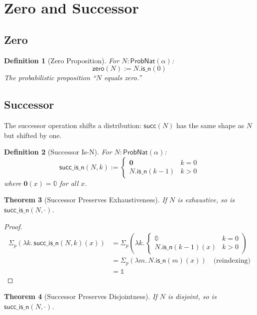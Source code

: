 \documentclass[11pt,a4paper]{article}
\newtheorem{theorem}{Theorem}[section]
\newtheorem{definition}[theorem]{Definition}
\newcommand{\ProbNat}{\mathsf{ProbNat}}
\newcommand{\pzero}{\mathbb{0}}
\newcommand{\pone}{\mathbb{1}}
\newcommand{\psum}{\Sigma_p}
\begin{document}
\section{Zero and Successor}

\subsection{Zero}

\begin{definition}[Zero Proposition]
For $N : \ProbNat(\alpha)$:
\[
\mathsf{zero}(N) := N.\mathsf{is\_n}(0)
\]
The probabilistic proposition ``$N$ equals zero.''
\end{definition}

\subsection{Successor}

The successor operation shifts a distribution: $\mathsf{succ}(N)$ has the same shape as $N$ but shifted by one.

\begin{definition}[Successor Is-N]
For $N : \ProbNat(\alpha)$:
\[
\mathsf{succ\_is\_n}(N, k) := \begin{cases}
    \mathbf{0} & k = 0 \\
    N.\mathsf{is\_n}(k-1) & k > 0
\end{cases}
\]
where $\mathbf{0}(x) = \pzero$ for all $x$.
\end{definition}

\begin{theorem}[Successor Preserves Exhaustiveness]
If $N$ is exhaustive, so is $\mathsf{succ\_is\_n}(N, \cdot)$.
\end{theorem}

\begin{proof}
\begin{align*}
    \psum(\lambda k.\, \mathsf{succ\_is\_n}(N, k)(x))
    &= \psum\left(\lambda k.\, \begin{cases} \pzero & k = 0 \\ N.\mathsf{is\_n}(k-1)(x) & k > 0 \end{cases}\right) \\
    &= \psum(\lambda m.\, N.\mathsf{is\_n}(m)(x)) \quad \text{(reindexing)} \\
    &= \pone
\end{align*}
\end{proof}

\begin{theorem}[Successor Preserves Disjointness]
If $N$ is disjoint, so is $\mathsf{succ\_is\_n}(N, \cdot)$.
\end{theorem}
\end{document}
